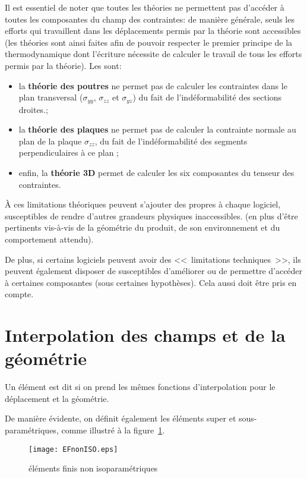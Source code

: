 \medskip
Il est essentiel de noter que toutes les théories ne permettent pas d'accéder à toutes les
composantes du champ des contraintes: de manière générale, seuls les efforts qui travaillent
dans les déplacements permis par la théorie sont accessibles (les théories sont ainsi faites
afin de pouvoir respecter le premier principe de la thermodynamique dont l'écriture nécessite
de calculer le travail de tous les efforts permis par la théorie).
Les  sont:
\begin{itemize}
   \item la \textbf{théorie des poutres} ne permet pas de calculer les contraintes dans le plan
	transversal ($\sigma_{yy}$, $\sigma_{zz}$ et $\sigma_{yz}$) du fait de l'indéformabilité
	des sections droites.;
   \item la \textbf{théorie des plaques} ne permet pas de calculer la contrainte normale au plan de la plaque
	$\sigma_{zz}$, du fait de l'indéformabilité des segments perpendiculaires à ce plan ;
   \item enfin, la \textbf{théorie 3D} permet de calculer les six composantes du tenseur des contraintes.
\end{itemize}

\medskip
À ces limitations théoriques peuvent s'ajouter des 
propres à chaque logiciel, susceptibles de rendre d'autres grandeurs physiques inaccessibles.
 (en plus d'être pertinents vis-à-vis de la géométrie du produit, de son environnement
et du comportement attendu).

De plus, si certains logiciels peuvent avoir des <<~limitations techniques~>>, ils peuvent
également disposer de  susceptibles d'améliorer
ou de permettre d'accéder à certaines composantes (sous certaines hypothèses). Cela aussi
doit être pris en compte.

\ifVersionAvecExemplesSepares\else
\fi

\medskip
\section{Interpolation des champs et de la géométrie}

Un élément est dit  si on prend les mêmes fonctions
d'interpolation pour le déplacement et la géométrie.

De manière évidente, on définit également les éléments super et sous-paramétriques,
comme illustré à la figure~\ref{EFnonISO}.
\begin{figure}[ht]
\centering
\texttt{[image: EFnonISO.eps]}
\caption{\label{EFnonISO} éléments finis non isoparamétriques}
\end{figure}

